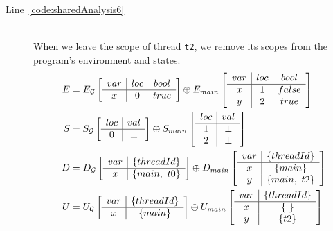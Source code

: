 \begin{description}
	\item[Line~\ref{code:sharedAnalysis6}] \hfill \\
		When we leave the scope of thread \verb$t2$, we remove its scopes from the
		program's environment and states.
		\begin{align*}
			E &= E_{\mathcal{G}} \left[
				\begin{array}{c | c c}
					var	& loc	& bool	\\ \hline
					x	& 0		& true
				\end{array}
			\right]
			\oplus
			E_{main} \left[
				\begin{array}{c | c c}
					var	& loc	& bool	\\ \hline
					x	& 1		& false	\\
					y	& 2		& true
				\end{array}
			\right] \\		
			S &= S_{\mathcal{G}} \left[
				\begin{array}{c | c c}
					loc	& val	\\ \hline
					0	& \bot
				\end{array}
			\right]
			\oplus
			S_{main} \left[
				\begin{array}{c | c c}
					loc	& val	\\ \hline
					1	& \bot	\\
					2	& \bot
				\end{array}
			\right] \\
			D &= D_{\mathcal{G}} \left[
				\begin{array}{c | c}
					var	& \lbrace threadId \rbrace	\\ \hline
					x	& \lbrace main,~t0 \rbrace
				\end{array}
			\right]
			\oplus
			D_{main} \left[
				\begin{array}{c | c c}
					var	& \lbrace threadId \rbrace	\\ \hline
					x	& \lbrace main \rbrace		\\
					y	& \lbrace main,~t2 \rbrace
				\end{array}
			\right] \\
			U &= U_{\mathcal{G}} \left[
				\begin{array}{c | c}
					var	& \lbrace threadId \rbrace	\\ \hline
					x	& \lbrace main \rbrace
				\end{array}
			\right]	
			\oplus
			U_{main} \left[
				\begin{array}{c | c c}
					var	& \lbrace threadId \rbrace	\\ \hline
					x	& \lbrace ~ \rbrace			\\
					y	& \lbrace t2 \rbrace
				\end{array}
			\right]
		\end{align*}
		

\end{description}
